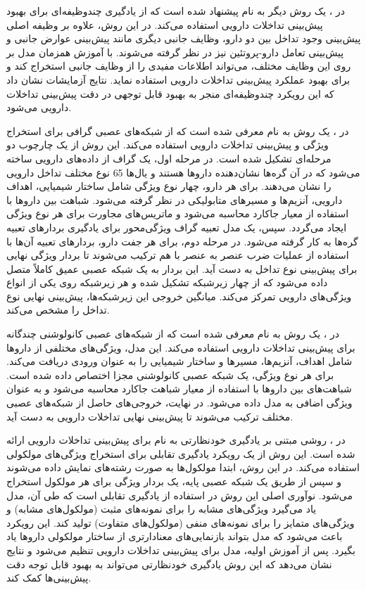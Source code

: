 در \cite{ref_deng2020}، یک روش دیگر به نام  پیشنهاد شده است که از یادگیری چندوظیفه‌ای برای بهبود پیش‌بینی تداخلات دارویی استفاده می‌کند. در این روش، علاوه بر وظیفه اصلی پیش‌بینی وجود تداخل بین دو دارو، وظایف جانبی دیگری مانند پیش‌بینی عوارض جانبی و پیش‌بینی تعامل دارو-پروتئین نیز در نظر گرفته می‌شوند. با آموزش همزمان مدل بر روی این وظایف مختلف،  می‌تواند اطلاعات مفیدی را از وظایف جانبی استخراج کند و برای بهبود عملکرد پیش‌بینی تداخلات دارویی استفاده نماید. نتایج آزمایشات نشان داد که این رویکرد چندوظیفه‌ای منجر به بهبود قابل توجهی در دقت پیش‌بینی تداخلات دارویی می‌شود.

در \cite{ref_rabeah2022}، یک روش به نام  معرفی شده است که از شبکه‌های عصبی گرافی برای استخراج ویژگی و پیش‌بینی تداخلات دارویی استفاده می‌کند. این روش از یک چارچوب دو مرحله‌ای تشکیل شده است. در مرحله اول، یک گراف از داده‌های دارویی ساخته می‌شود که در آن گره‌ها نشان‌دهنده داروها هستند و یال‌ها 65 نوع مختلف تداخل دارویی را نشان می‌دهند. برای هر دارو، چهار نوع ویژگی شامل ساختار شیمیایی، اهداف دارویی، آنزیم‌ها و مسیرهای متابولیکی در نظر گرفته می‌شود. شباهت بین داروها با استفاده از معیار جاکارد محاسبه می‌شود و ماتریس‌های مجاورت برای هر نوع ویژگی ایجاد می‌گردد. سپس، یک مدل تعبیه گراف ویژگی‌محور برای یادگیری بردارهای تعبیه گره‌ها به کار گرفته می‌شود. در مرحله دوم، برای هر جفت دارو، بردارهای تعبیه آن‌ها با استفاده از عملیات ضرب عنصر به عنصر با هم ترکیب می‌شوند تا بردار ویژگی نهایی برای پیش‌بینی نوع تداخل به دست آید. این بردار به یک شبکه عصبی عمیق کاملاً متصل داده می‌شود که از چهار زیرشبکه تشکیل شده و هر زیرشبکه روی یکی از انواع ویژگی‌های دارویی تمرکز می‌کند. میانگین خروجی این زیرشبکه‌ها، پیش‌بینی نهایی نوع تداخل را مشخص می‌کند.

در \cite{ref_asfand2024}، یک روش به نام  معرفی شده است که از شبکه‌های عصبی کانولوشنی چندگانه برای پیش‌بینی تداخلات دارویی استفاده می‌کند. این مدل، ویژگی‌های مختلفی از داروها شامل اهداف، آنزیم‌ها، مسیرها و ساختار شیمیایی را به عنوان ورودی دریافت می‌کند. برای هر نوع ویژگی، یک شبکه عصبی کانولوشنی مجزا اختصاص داده شده است. شباهت‌های بین داروها با استفاده از معیار شباهت جاکارد محاسبه می‌شود و به عنوان ویژگی اضافی به مدل داده می‌شود. در نهایت، خروجی‌های حاصل از شبکه‌های عصبی مختلف ترکیب می‌شوند تا پیش‌بینی نهایی تداخلات دارویی به دست آید.

در \cite{ref_kpanou2024}، روشی مبتنی بر یادگیری خودنظارتی به نام  برای پیش‌بینی تداخلات دارویی ارائه شده است. این روش از یک رویکرد یادگیری تقابلی برای استخراج ویژگی‌های مولکولی استفاده می‌کند. در این روش، ابتدا مولکول‌ها به صورت رشته‌های  نمایش داده می‌شوند و سپس از طریق یک شبکه عصبی پایه، یک بردار ویژگی برای هر مولکول استخراج می‌شود. نوآوری اصلی این روش در استفاده از یادگیری تقابلی است که طی آن، مدل یاد می‌گیرد ویژگی‌های مشابه را برای نمونه‌های مثبت (مولکول‌های مشابه) و ویژگی‌های متمایز را برای نمونه‌های منفی (مولکول‌های متفاوت) تولید کند. این رویکرد باعث می‌شود که مدل بتواند بازنمایی‌های معنادارتری از ساختار مولکولی داروها یاد بگیرد. پس از آموزش اولیه، مدل برای پیش‌بینی تداخلات دارویی تنظیم می‌شود و نتایج نشان می‌دهد که این روش یادگیری خودنظارتی می‌تواند به بهبود قابل توجه دقت پیش‌بینی‌ها کمک کند.

